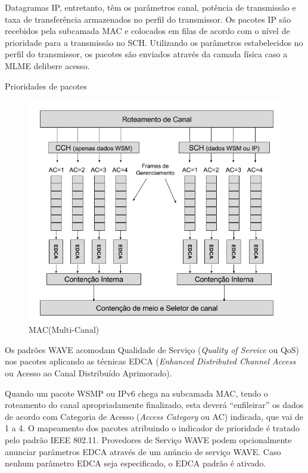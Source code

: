 \documentclass[
12pt,				%
openright,			%
oneside,			%
a4paper,			%
brazil,				%
]{abntex2}
\begin{document}
	\par Datagramas IP, entretanto, têm os parâmetros canal, potência de transmissão e taxa de transferência armazenados no perfil do transmissor. Os pacotes IP são recebidos pela subcamada MAC e colocados em filas de acordo com o nível de prioridade para a transmissão no SCH. Utilizando os parâmetros estabelecidos no perfil do transmissor, os pacotes são enviados através da camada física caso a MLME delibere acesso.

	\newpage
	
	\begin{description}
        \item[Prioridades de pacotes]
    \end{description}

	\begin{figure} [H]
		\centering
		\includegraphics[scale=.5]{figuras/cap3/26MAC(MultiCanal)}
		\caption{\label{fig_26}MAC(Multi-Canal)}
	\end{figure}
	
	\par Os padrões WAVE acomodam Qualidade de Serviço (\textit{Quality of Service} ou QoS) nos pacotes aplicando as técnicas EDCA (\textit{Enhanced Distributed Channel Access} ou Acesso ao Canal Distribuído Aprimorado).
	
	\par Quando um pacote WSMP ou IPv6 chega na subcamada MAC, tendo o roteamento do canal apropriadamente finalizado, esta deverá “enfileirar” os dados de acordo com Categoria de Acesso (\textit{Access Category} ou AC) indicada, que vai de 1 a 4. O mapeamento dos pacotes atribuindo o indicador de prioridade é tratado pelo padrão IEEE 802.11. Provedores de Serviço WAVE podem opcionalmente anunciar parâmetros EDCA através de um anúncio de serviço WAVE. Caso nenhum parâmetro EDCA seja especificado, o EDCA padrão é ativado.
	
\end{document}

